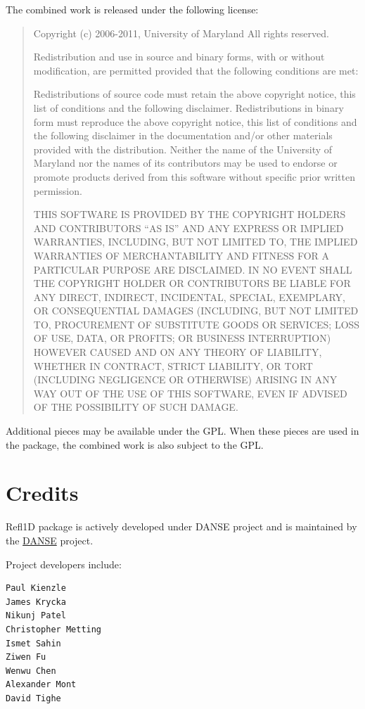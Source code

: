 \documentclass[letterpaper,10pt,english]{sphinxmanual}
\begin{document}
The combined work is released under the following license:
\begin{quote}

Copyright (c) 2006-2011, University of Maryland All rights reserved.

Redistribution and use in source and binary forms, with or without
modification, are permitted provided that the following conditions
are met:

Redistributions of source code must retain the above copyright notice,
this list of conditions and the following disclaimer. Redistributions
in binary form must reproduce the above copyright notice, this list of
conditions and the following disclaimer in the documentation and/or
other materials provided with the distribution. Neither the name of the
University of Maryland nor the names of its contributors may be used to
endorse or promote products derived from this software without specific
prior written permission.

THIS SOFTWARE IS PROVIDED BY THE COPYRIGHT HOLDERS AND CONTRIBUTORS
``AS IS'' AND ANY EXPRESS OR IMPLIED WARRANTIES, INCLUDING, BUT NOT
LIMITED TO, THE IMPLIED WARRANTIES OF MERCHANTABILITY AND FITNESS FOR
A PARTICULAR PURPOSE ARE DISCLAIMED. IN NO EVENT SHALL THE COPYRIGHT
HOLDER OR CONTRIBUTORS BE LIABLE FOR ANY DIRECT, INDIRECT, INCIDENTAL,
SPECIAL, EXEMPLARY, OR CONSEQUENTIAL DAMAGES (INCLUDING, BUT NOT LIMITED
TO, PROCUREMENT OF SUBSTITUTE GOODS OR SERVICES; LOSS OF USE, DATA,
OR PROFITS; OR BUSINESS INTERRUPTION) HOWEVER CAUSED AND ON ANY THEORY
OF LIABILITY, WHETHER IN CONTRACT, STRICT LIABILITY, OR TORT (INCLUDING
NEGLIGENCE OR OTHERWISE) ARISING IN ANY WAY OUT OF THE USE OF THIS
SOFTWARE, EVEN IF ADVISED OF THE POSSIBILITY OF SUCH DAMAGE.
\end{quote}

Additional pieces may be available under the GPL. When these pieces
are used in the package, the combined work is also subject to the GPL.


\section{Credits}
\label{getting_started/license:credits}
Refl1D package is actively developed under DANSE project and is
maintained by the \href{http://danse.us}{DANSE} project.

Project developers include:

\begin{Verbatim}[commandchars=@\[\]]
Paul Kienzle
James Krycka
Nikunj Patel
Christopher Metting
Ismet Sahin
Ziwen Fu
Wenwu Chen
Alexander Mont
David Tighe
\end{Verbatim}
\end{document}

